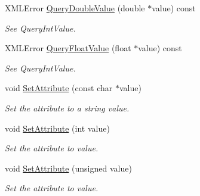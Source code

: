 \begin{DoxyCompactItemize}
X\+M\+L\+Error \mbox{\hyperlink{classtinyxml2_1_1_x_m_l_attribute_a2aa6e55e8ea03af0609cf6690bff79b9}{Query\+Double\+Value}} (double $\ast$value) const
\begin{DoxyCompactList}\small\item\em See Query\+Int\+Value. \end{DoxyCompactList}\item 
\mbox{\label{classtinyxml2_1_1_x_m_l_attribute_a049dea6449a6259b6cfed44a9427b607}} 
X\+M\+L\+Error \mbox{\hyperlink{classtinyxml2_1_1_x_m_l_attribute_a049dea6449a6259b6cfed44a9427b607}{Query\+Float\+Value}} (float $\ast$value) const
\begin{DoxyCompactList}\small\item\em See Query\+Int\+Value. \end{DoxyCompactList}\item 
\mbox{\label{classtinyxml2_1_1_x_m_l_attribute_a406d2c4a13c7af99a65edb59dd9f7581}} 
void \mbox{\hyperlink{classtinyxml2_1_1_x_m_l_attribute_a406d2c4a13c7af99a65edb59dd9f7581}{Set\+Attribute}} (const char $\ast$value)
\begin{DoxyCompactList}\small\item\em Set the attribute to a string value. \end{DoxyCompactList}\item 
\mbox{\label{classtinyxml2_1_1_x_m_l_attribute_ad86d7d7058d76761c3a80662566a57e5}} 
void \mbox{\hyperlink{classtinyxml2_1_1_x_m_l_attribute_ad86d7d7058d76761c3a80662566a57e5}{Set\+Attribute}} (int value)
\begin{DoxyCompactList}\small\item\em Set the attribute to value. \end{DoxyCompactList}\item 
\mbox{\label{classtinyxml2_1_1_x_m_l_attribute_ae70468c0f6df2748ba3529c716999fae}} 
void \mbox{\hyperlink{classtinyxml2_1_1_x_m_l_attribute_ae70468c0f6df2748ba3529c716999fae}{Set\+Attribute}} (unsigned value)
\begin{DoxyCompactList}\small\item\em Set the attribute to value. \end{DoxyCompactList}\item 

\end{DoxyCompactItemize}
